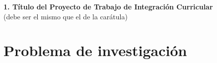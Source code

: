 \clearpage
\clearpage
\thispagestyle{empty}
\null
\vfill
\begin{center}
{\Huge \textbf{1. Título del Proyecto de Trabajo de Integración Curricular}}\\[1em]
(debe ser el mismo que el de la carátula)
\end{center}
\vfill
\clearpage

\section{Problema de investigación}